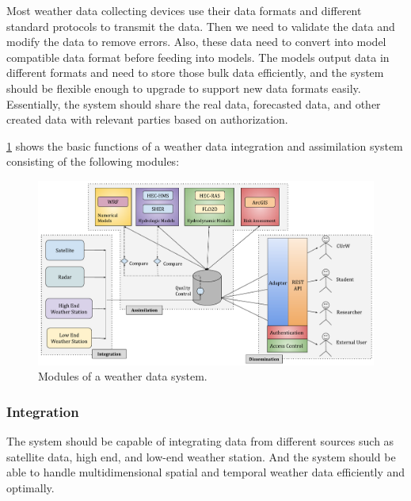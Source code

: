 Most weather data collecting devices use their data formats and different standard protocols to transmit the data. Then we need to validate the data and modify the data to remove errors. Also, these data need to convert into model compatible data format before feeding into models. The models output data in different formats and need to store those bulk data efficiently, and the system should be flexible enough to upgrade to support new data formats easily. Essentially, the system should share the real data, forecasted data, and other created data with relevant parties based on authorization.



\cref{fi:wdia_components} shows the basic functions of a weather data integration and assimilation system consisting of the following modules: 

\begin{figure}[htbp]
\centerline{\includegraphics[width=1\textwidth]{method/misc/weather_data_system_components.pdf}}
\caption{Modules of a weather data system.}
\label{fi:wdia_components}
\end{figure}

\subsubsection{Integration }
The system should be capable of integrating data from different sources such as satellite data, high end, and low-end weather station. And the system should be able to handle multidimensional spatial and temporal weather data efficiently and optimally.
